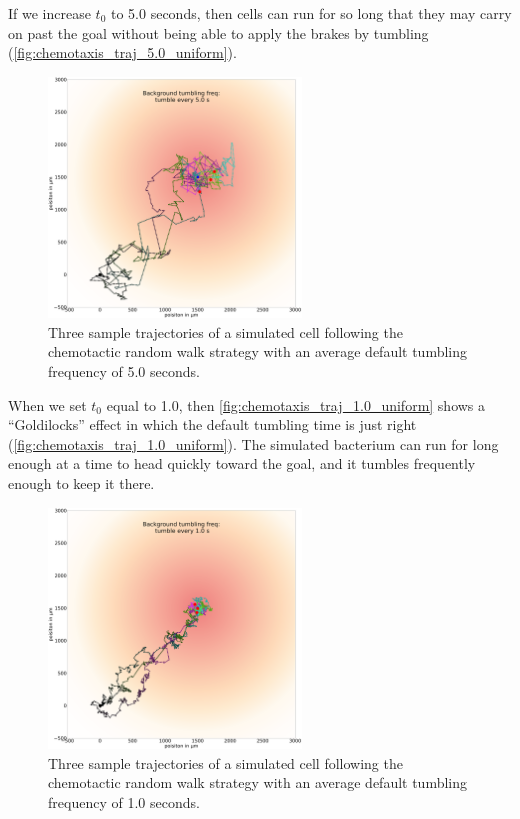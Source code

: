 If we increase $t_0$ to 5.0 seconds, then cells can run for so long that they may carry on past the goal without being able to apply the brakes by tumbling (\autoref{fig:chemotaxis_traj_5.0_uniform}).

\begin{figure}[h]
\centering
\mySfFamily
\includegraphics[width = 0.6\textwidth]{../images/chemotaxis_traj_5.0_uniform.png}
\caption{Three sample trajectories of a simulated cell following the chemotactic random walk strategy with an average default tumbling frequency of 5.0 seconds.}
\label{fig:chemotaxis_traj_5.0_uniform}
\end{figure}


When we set $t_0$ equal to 1.0, then \autoref{fig:chemotaxis_traj_1.0_uniform} shows a ``Goldilocks'' effect in which the default tumbling time is just right (\autoref{fig:chemotaxis_traj_1.0_uniform}). The simulated bacterium can run for long enough at a time to head quickly toward the goal, and it tumbles frequently enough to keep it there.

\begin{figure}[h]
\centering
\mySfFamily
\includegraphics[width = 0.6\textwidth]{../images/chemotaxis_traj_1.0_uniform.png}
\caption{Three sample trajectories of a simulated cell following the chemotactic random walk strategy with an average default tumbling frequency of 1.0 seconds.}
\label{fig:chemotaxis_traj_1.0_uniform}
\end{figure}


